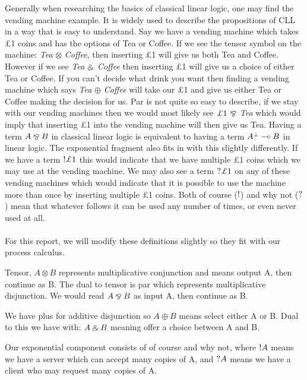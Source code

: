 \noindent
Generally when researching the basics of classical linear logic, one may find the vending machine example. It is 
widely used to describe the propositions of CLL in a way that is easy to understand. Say we have a vending machine 
which takes \pounds 1 coins and has the options of Tea or Coffee. If we see the tensor symbol on the machine: \emph{Tea} 
$\otimes$ \emph{Coffee}, then inserting \pounds 1 will give us both Tea and Coffee. However if we see \emph{Tea} $\mathbin{\binampersand}$ \emph{Coffee} then 
inserting \pounds 1 will give us a choice of either Tea or Coffee. If you can't decide what drink you want then finding a 
vending machine which says \emph{Tea} $\oplus$ \emph{Coffee} will take our \pounds 1 and give us either Tea or Coffee making the decision 
for us. Par is not quite so easy to describe, if we stay with our vending machines then we would most likely see 
$\pounds 1 \ \parr$ \emph{Tea} which would imply that inserting \pounds 1 into the vending machine will then give us Tea. 
Having a term $A \mathbin{\bindnasrepma} B$ in classical linear logic is equivalent to having a term $\negg{A} \multimap B$ in linear logic. 
The exponential fragment also fits in with this slightly differently. If we have a term $\ofc \pounds 1$ this would indicate 
that we have multiple \pounds 1 coins which we may use at the vending machine. We may also see a term $\whynot \pounds 1$ 
on any of these vending machines which would indicate that it is possible to use the machine more than once by inserting 
multiple \pounds 1 coins. Both of course ($\textrm{!}$) and why not ($\textrm{?}$) mean that whatever follows it can be used any 
number of times, or even never used at all.
\\\\
\noindent
For this report, we will modify these definitions slightly so they fit with our process calculus.

Tensor, $A \otimes B$ represents multiplicative conjunction and means output A, then continue as B. The dual to tensor 
is par which represents multiplicative disjunction. We would read $A \mathbin{\bindnasrepma} B$ as input A, then continue as B. 

We have plus for additive disjunction so $A \oplus B$ means select either A or B.  Dual to this we have with: 
$A \mathbin{\binampersand} B$ meaning offer a choice between A and B. 

Our exponential component consists of of course and why not, where 
$\textrm{!} A$ means we have a server which can accept many copies of A, and $\textrm{?} A$ means we have a client 
who may request many copies of A. 

